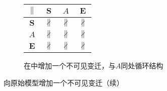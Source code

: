 \begin{figure}[htbp]
\begin{subfigure}{1\textwidth}
\begin{minipage}[b]{0.3\textwidth}
\begin{tabular}{|c|c|c|c|}
        $\parallel$ & $\bm{S}$ & $A$ & $\bm{E}$\\ \hline
        $\bm{S}$ & $\nparallel$ & $\nparallel$ & $\nparallel$\\ \hline
        $A$ & $\nparallel$ & $\nparallel$ & $\nparallel$\\ \hline
        $\bm{E}$ & $\nparallel$ & $\nparallel$ & $\nparallel$\\ \hline
      \end{tabular}
    \end{minipage}
    \caption{在中增加一个不可见变迁，与$A$同处循环结构}
    \label{fig:uniqueness_3_d}
  \end{subfigure}
  \vspace{6pt}
  \caption{向原始模型增加一个不可见变迁（续）}
\end{figure}

